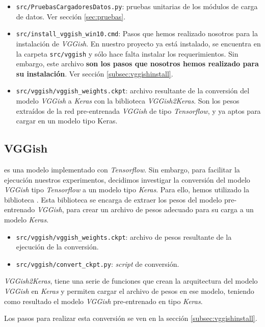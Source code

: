 \begin{itemize}
\item \texttt{src/PruebasCargadoresDatos.py}: pruebas unitarias de los módulos de carga de datos. Ver sección \ref{sec:pruebas}.
\item \texttt{src/install\_vggish\_win10.cmd}: Pasos que hemos realizado nosotros para la instalación de \textit{VGGish}. En nuestro proyecto ya está instalado, se encuentra en la carpeta \texttt{src/vggish} y sólo hace falta instalar los requerimientos. Sin embargo, este archivo \textbf{son los pasos que nosotros hemos realizado para su instalación}. Ver sección \ref{subsec:vggishinstall}.
\item \texttt{src/vggish/vggish\_weights.ckpt}: archivo resultante de la conversión del modelo \textit{VGGish} a \textit{Keras} con la biblioteca \textit{VGGish2Keras}. Son los pesos extraídos de la red pre-entrenada \textit{VGGish} de tipo \textit{Tensorflow}, y ya aptos para cargar en un modelo tipo Keras.
\end{itemize}


\subsection{VGGish}
 es una modelo implementado con \textit{Tensorflow}. Sin embargo, para facilitar la ejecución nuestros experimentos, decidimos investigar la conversión del modelo \textit{VGGish} tipo \textit{Tensorflow} a un modelo tipo \textit{Keras}. Para ello, hemos utilizado la biblioteca . Esta biblioteca se encarga de extraer los pesos del modelo pre-entrenado \textit{VGGish}, para crear un archivo de pesos adecuado para su carga a un modelo \textit{Keras}.
\begin{itemize}
\item \texttt{src/vggish/vggish\_weights.ckpt}: archivo de pesos resultante de la ejecución de la conversión.
\item \texttt{src/vggish/convert\_ckpt.py}: \textit{script} de conversión.
\end{itemize}

\textit{VGGish2Keras}, tiene una serie de funciones que crean la arquitectura del modelo \textit{VGGish} en \textit{Keras} y permiten cargar el archivo de pesos en ese modelo, teniendo como resultado el modelo \textit{VGGish} pre-entrenado en tipo \textit{Keras}.

Los pasos para realizar esta conversión se ven en la sección \ref{subsec:vggishinstall}.


